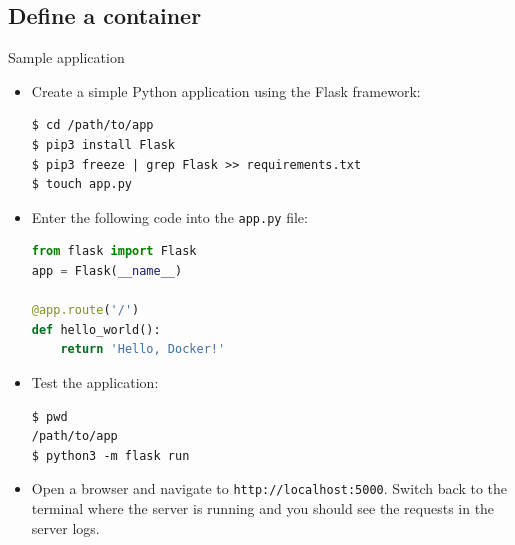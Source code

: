 \subsection{Define a container}

\begin{frame}[fragile]{Sample application}
 \begin{itemize}
  \item Create a simple Python application using the Flask framework:
\begin{lstlisting}[language=shell]
$ cd /path/to/app
$ pip3 install Flask
$ pip3 freeze | grep Flask >> requirements.txt
$ touch app.py  
\end{lstlisting}

  \item Enter the following code into the \texttt{app.py} file:
\begin{lstlisting}[language=python]
from flask import Flask
app = Flask(__name__)

@app.route('/')
def hello_world():
    return 'Hello, Docker!'
\end{lstlisting}
  
  \item Test the application:
\begin{lstlisting}[language=shell]
$ pwd
/path/to/app
$ python3 -m flask run
\end{lstlisting}
  
  \item Open a browser and navigate to \texttt{http://localhost:5000}. Switch back to the terminal where the server is running and you should see the requests in the server logs.
 \end{itemize}
\end{frame}


